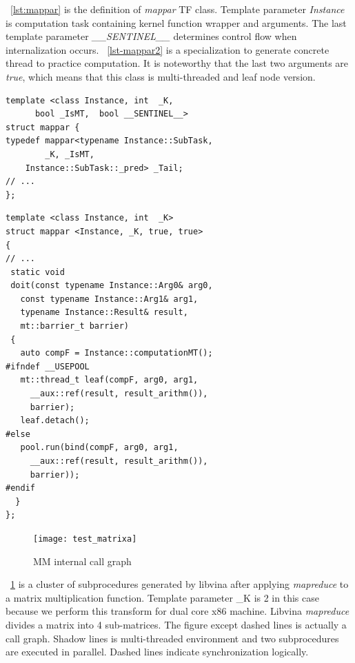 \documentclass[10pt, conference, compsocconf]{IEEEtran}
\begin{document}
~\ref{lst:mappar} is the definition of \emph{mappar} TF class. Template parameter \emph{Instance} is computation task containing kernel function wrapper and arguments. The last template parameter \emph{\_\_SENTINEL\_\_} determines control flow when internalization occurs. ~\ref{lst-mappar2} is a specialization to generate concrete thread to practice computation. It is noteworthy that the last two arguments are \emph{true}, which means that this class is multi-threaded and leaf node version. 

\makebox[3.1\width]{\hrulefill}
\begin{verbatim}
template <class Instance, int  _K,
	  bool _IsMT,  bool __SENTINEL__>
struct mappar {
typedef mappar<typename Instance::SubTask, 
        _K, _IsMT, 
	Instance::SubTask::_pred> _Tail;
// ...
};
\end{verbatim}
\begin{center}
\label{lst:mappar}
\end{center}

\makebox[3.1\width]{\hrulefill}
\begin{verbatim}
template <class Instance, int  _K>
struct mappar <Instance, _K, true, true> 
{
// ...
 static void 
 doit(const typename Instance::Arg0& arg0, 
   const typename Instance::Arg1& arg1,
   typename Instance::Result& result,
   mt::barrier_t barrier)
 {
   auto compF = Instance::computationMT();
#ifndef __USEPOOL
   mt::thread_t leaf(compF, arg0, arg1, 
     __aux::ref(result, result_arithm()), 
     barrier);
   leaf.detach();
#else
   pool.run(bind(compF, arg0, arg1, 
     __aux::ref(result, result_arithm()), 
     barrier));
#endif
  }
};
\end{verbatim}
\begin{center}
\label{lst:mappar2}
\end{center}

\begin{figure}
\centering
\texttt{[image: test\_matrixa]}
\caption{MM internal call graph}
\label{fig:mm}
\end{figure}

~\ref{fig:mm} is a cluster of subprocedures generated by libvina after applying \emph{mapreduce} to a matrix multiplication function. Template parameter \_K is 2 in this case because we perform this transform for dual core x86 machine. Libvina \emph{mapreduce} divides a matrix into 4 sub-matrices. The figure except dashed lines is actually a call graph. Shadow lines is multi-threaded environment and two subprocedures are executed in parallel. Dashed lines indicate synchronization logically. 
\end{document}
